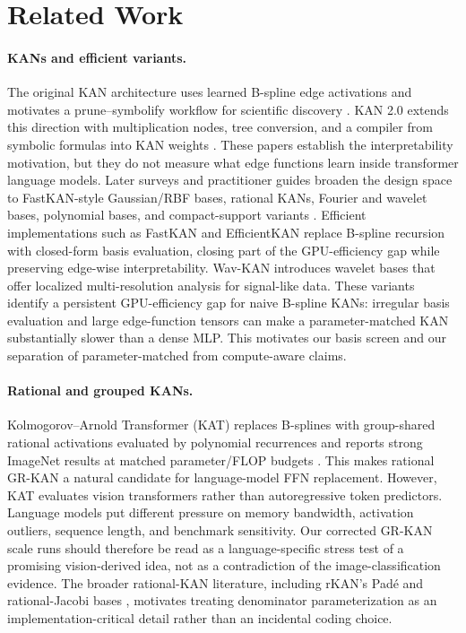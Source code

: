 \documentclass{article}
\newcommand{\modelname}[1]{\textsc{#1}}
\newcommand{\grkan}{\modelname{GR-KAN}}
\begin{document}
\section{Related Work}

\paragraph{KANs and efficient variants.}
The original KAN architecture uses learned B-spline edge activations and motivates a prune--symbolify workflow for scientific discovery \citep{liu2024kan}. KAN 2.0 extends this direction with multiplication nodes, tree conversion, and a compiler from symbolic formulas into KAN weights \citep{liu2024kan2}. These papers establish the interpretability motivation, but they do not measure what edge functions learn inside transformer language models. Later surveys and practitioner guides broaden the design space to FastKAN-style Gaussian/RBF bases, rational KANs, Fourier and wavelet bases, polynomial bases, and compact-support variants \citep{somvanshi2024survey,noorizadegan2025practitioners}. Efficient implementations such as FastKAN \citep{li2024fastkan} and EfficientKAN \citep{blealtan2024efficientkan} replace B-spline recursion with closed-form basis evaluation, closing part of the GPU-efficiency gap while preserving edge-wise interpretability. Wav-KAN \citep{bozorgasl2024wavkan} introduces wavelet bases that offer localized multi-resolution analysis for signal-like data. These variants identify a persistent GPU-efficiency gap for naive B-spline KANs: irregular basis evaluation and large edge-function tensors can make a parameter-matched KAN substantially slower than a dense MLP. This motivates our basis screen and our separation of parameter-matched from compute-aware claims.

\paragraph{Rational and grouped KANs.}
Kolmogorov--Arnold Transformer (KAT) replaces B-splines with group-shared rational activations evaluated by polynomial recurrences and reports strong ImageNet results at matched parameter/FLOP budgets \citep{yang2024kat}. This makes rational \grkan{} a natural candidate for language-model FFN replacement. However, KAT evaluates vision transformers rather than autoregressive token predictors. Language models put different pressure on memory bandwidth, activation outliers, sequence length, and benchmark sensitivity. Our corrected \grkan{} scale runs should therefore be read as a language-specific stress test of a promising vision-derived idea, not as a contradiction of the image-classification evidence. The broader rational-KAN literature, including rKAN's Pad\'{e} and rational-Jacobi bases \citep{aghaei2024rkan}, motivates treating denominator parameterization as an implementation-critical detail rather than an incidental coding choice.
\end{document}
